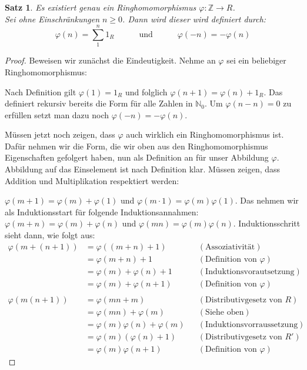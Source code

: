 \documentclass{article}
\newtheorem*{satz}{Satz}
\theoremstyle{definition}
\theoremstyle{remark}
\begin{document}
\begin{satz}
Es existiert genau ein Ringhomomorphismus $\varphi: \mathbb Z \to R$. \\
Sei ohne Einschränkungen $n\ge0$. Dann wird dieser wird definiert durch:
\[\varphi(n)=\sum_1^n 1_R \hspace{3em} \text{und} \hspace{3em} \varphi(-n)=-\varphi(n)\]
\end{satz}
\begin{proof} Beweisen wir zunächst die Eindeutigkeit. Nehme an $\varphi$ sei ein beliebiger
Ringhomomorphismus: 

Nach Definition gilt $\varphi(1)=1_R$ und folglich $\varphi(n+1)=\varphi(n)+1_R$.
Das definiert rekursiv bereits die Form für alle Zahlen in $\mathbb N_0$. Um $\varphi(n-n)=0$ zu erfüllen
setzt man dazu noch $\varphi(-n)=-\varphi(n)$.

\vspace{0.7em}
Müssen jetzt noch zeigen, dass $\varphi$ auch wirklich ein Ringhomomorphismus ist. Dafür nehmen wir die Form,
die wir oben aus den Ringhomomorphismus Eigenschaften gefolgert haben, nun als Definition an für unser
Abbildung $\varphi$. Abbildung auf das Einselement ist nach Definition klar. Müssen zeigen, dass Addition und
Multiplikation respektiert werden:

$\varphi(m+1)=\varphi(m)+\varphi(1)$ und
$\varphi(m\cdot 1)=\varphi(m)\varphi(1)$. Das nehmen wir als Induktionsstart für folgende Induktionsannahmen:
$\varphi(m+n)=\varphi(m)+\varphi(n)$ und $\varphi(mn)=\varphi(m)\varphi(n)$. Induktionsschritt sieht dann, wie
folgt aus:
\begin{align*}
    \varphi(m+(n+1)) &= \varphi((m+n)+1)    &&(\text{Assoziativität}) \\
                     &= \varphi(m+n)+1      &&(\text{Definition von }\varphi) \\
                     &= \varphi(m)+\varphi(n)+1 &&(\text{Induktionsvorautsetzung}) \\
                     &= \varphi(m)+\varphi(n+1) &&(\text{Definition von }\varphi) \\
                     \\
    \varphi(m(n+1))  &= \varphi(mn+m)       &&(\text{Distributivgesetz von }R) \\
                     &= \varphi(mn)+\varphi(m) &&(\text{Siehe oben}) \\
                     &= \varphi(m)\varphi(n)+\varphi(m) &&(\text{Induktionsvorraussetzung}) \\
                     &= \varphi(m)(\varphi(n)+1) &&(\text{Distributivgesetz von }R') \\
                     &= \varphi(m)\varphi(n+1) &&(\text{Definition von }\varphi)
\end{align*}
\end{proof}
\end{document}
